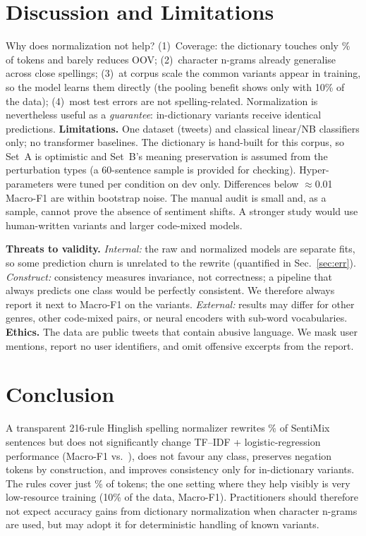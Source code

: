 \documentclass[10pt,twocolumn,letterpaper]{article}
\begin{document}
\section{Discussion and Limitations}
Why does normalization not help? (1)~Coverage: the dictionary touches only \VocabVarShare\% of tokens and barely reduces OOV; (2)~character n-grams already generalise across close spellings; (3)~at corpus scale the common variants appear in training, so the model learns them directly (the pooling benefit shows only with 10\% of the data); (4)~most test errors are not spelling-related. Normalization is nevertheless useful as a \emph{guarantee}: in-dictionary variants receive identical predictions. \textbf{Limitations.} One dataset (tweets) and classical linear/NB classifiers only; no transformer baselines. The dictionary is hand-built for this corpus, so Set~A is optimistic and Set~B's meaning preservation is assumed from the perturbation types (a 60-sentence sample is provided for checking). Hyper-parameters were tuned per condition on dev only. Differences below $\approx$0.01 Macro-F1 are within bootstrap noise. The manual audit is small and, as a sample, cannot prove the absence of sentiment shifts. A stronger study would use human-written variants and larger code-mixed models.

\textbf{Threats to validity.} \emph{Internal:} the raw and normalized models are separate fits, so some prediction churn is unrelated to the rewrite (quantified in Sec.~\ref{sec:err}). \emph{Construct:} consistency measures invariance, not correctness; a pipeline that always predicts one class would be perfectly consistent. We therefore always report it next to Macro-F1 on the variants. \emph{External:} results may differ for other genres, other code-mixed pairs, or neural encoders with sub-word vocabularies. \textbf{Ethics.} The data are public tweets that contain abusive language. We mask user mentions, report no user identifiers, and omit offensive excerpts from the report.

\section{Conclusion}
A transparent 216-rule Hinglish spelling normalizer rewrites \ChangedPct\% of SentiMix sentences but does not significantly change TF--IDF + logistic-regression performance (Macro-F1 \RawTestF{} vs.\ \NormTestF{}), does not favour any class, preserves negation tokens by construction, and improves consistency only for in-dictionary variants. The rules cover just \VocabVarShare\% of tokens; the one setting where they help visibly is very low-resource training (10\% of the data, \LCTenDiff{} Macro-F1). Practitioners should therefore not expect accuracy gains from dictionary normalization when character n-grams are used, but may adopt it for deterministic handling of known variants.
\end{document}
